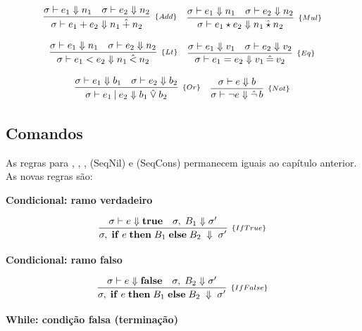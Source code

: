 \[
  \begin{array}{cc}
    \infer[_{\{Add\}}]{\sigma \vdash e_1 + e_2 \Downarrow n_1
    \mathbin{\hat{+}} n_2}{\sigma \vdash e_1 \Downarrow n_1 & \sigma \vdash e_2
    \Downarrow n_2}
    &
    \infer[_{\{Mul\}}]{\sigma \vdash e_1 \star e_2 \Downarrow n_1
    \mathbin{\hat{\star}} n_2}{\sigma \vdash e_1 \Downarrow n_1 &
    \sigma \vdash e_2\Downarrow n_2}
  \end{array}
\]

\[
  \begin{array}{cc}
    \infer[_{\{Lt\}}]{\sigma \vdash e_1 < e_2 \Downarrow n_1
    \mathbin{\hat{<}} n_2}
    {\sigma \vdash e_1 \Downarrow n_1 \quad \sigma \vdash e_2
    \Downarrow n_2}
    &
    \infer[_{\{Eq\}}]{\sigma \vdash e_1 = e_2 \Downarrow v_1
    \mathbin{\hat{=}} v_2}{\sigma \vdash e_1 \Downarrow v_1 & \sigma \vdash e_2
    \Downarrow v_2}
  \end{array}
\]

\[
  \begin{array}{cc}
    \infer[_{\{Or\}}]{\sigma \vdash e_1 \mathbin{|} e_2 \Downarrow b_1
    \mathbin{\hat{\lor}} b_2}{\sigma \vdash e_1 \Downarrow b_1 &
      \sigma \vdash e_2
    \Downarrow b_2}
    &
    \infer[_{\{Not\}}]{\sigma \vdash \neg e \Downarrow \hat{\neg}\, b}
    {\sigma \vdash e \Downarrow b}
  \end{array}
\]

\subsection{Comandos}

As regras para ,
, ,
(SeqNil) e (SeqCons) permanecem iguais ao capítulo anterior. As novas
regras são:

\textbf{Condicional: ramo verdadeiro}

\[
  \infer[_{\{IfTrue\}}]{\sigma,\; \mathbf{if}\; e\; \mathbf{then}\;
    B_1\; \mathbf{else}\;
  B_2 \;\Downarrow\; \sigma'}{\sigma \vdash e \Downarrow
    \mathbf{true} \quad \sigma,\; B_1
  \Downarrow \sigma'}
\]

\textbf{Condicional: ramo falso}

\[
  \infer[_{\{IfFalse\}}]{\sigma,\; \mathbf{if}\; e\; \mathbf{then}\;
    B_1\; \mathbf{else}\;
  B_2 \;\Downarrow\; \sigma'}{\sigma \vdash e \Downarrow
    \mathbf{false} \quad \sigma,\; B_2
  \Downarrow \sigma'}
\]

\textbf{While: condição falsa (terminação)}

